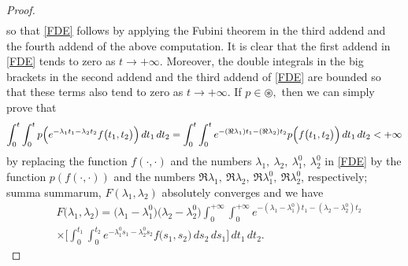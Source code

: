 \documentclass[10pt,a4paper]{amsart}
\begin{document}
\begin{proof}
\begin{align*}
\end{align*}
so that \eqref{FDE} follows by applying the Fubini theorem in the third addend and the fourth addend of the above computation. It is clear that the first addend in \eqref{FDE} tends to zero as $t\rightarrow +\infty.$ Moreover, the double integrals in the big brackets in the second addend and the third addend of \eqref{FDE} are bounded so that these terms also tend to zero as $t\rightarrow +\infty.$ If $p\in \circledast,$ then we can simply prove that{\small
$$
\int^{t}_{0}\int^{t}_{0}p\Bigl(e^{-\lambda_{1}t_{1}-\lambda_{2}t_{2}}f\bigl( t_{1},t_{2}\bigr)\Bigr)\, dt_{1}\, dt_{2}= \int^{t}_{0}\int^{t}_{0}e^{-(\Re \lambda_{1})t_{1}-(\Re \lambda_{2})t_{2}}p\Bigl(f\bigl( t_{1},t_{2}\bigr)\Bigr)\, dt_{1}\, dt_{2}<+\infty
$$}
by replacing the function $f(\cdot,\cdot)$ and the numbers $\lambda_{1},\ \lambda_{2},\ \lambda_{1}^{0},\ \lambda_{2}^{0}$ in \eqref{FDE} by the function $p(f(\cdot,\cdot))$ and the numbers $\Re\lambda_{1},\ \Re \lambda_{2},\ \Re \lambda_{1}^{0},\ \Re \lambda_{2}^{0}$, respectively; summa summarum, $F(\lambda_{1},\lambda_{2})$ absolutely converges and we have 
\begin{align*}
& F\bigl( \lambda_{1},\lambda_{2}\bigr)=\bigl( \lambda_{1}-\lambda_{1}^{0}\bigr)\bigl( \lambda_{2}-\lambda_{2}^{0}\bigr)
\int^{+\infty}_{0}\int^{+\infty}_{0}e^{-(\lambda_{1}-\lambda_{1}^{0})t_{1}-(\lambda_{2}-\lambda_{2}^{0})t_{2}}
\\& \times \Biggl[ \int^{t_{1}}_{0}\int^{t_{2}}_{0}e^{-\lambda_{1}^{0}s_{1}-\lambda_{2}^{0}s_{2}}f\bigl( s_{1},s_{2}\bigr) \, ds_{2}\, ds_{1} \Biggr]\, dt_{1}\, dt_{2}.
\end{align*}


\end{proof}
\end{document}
